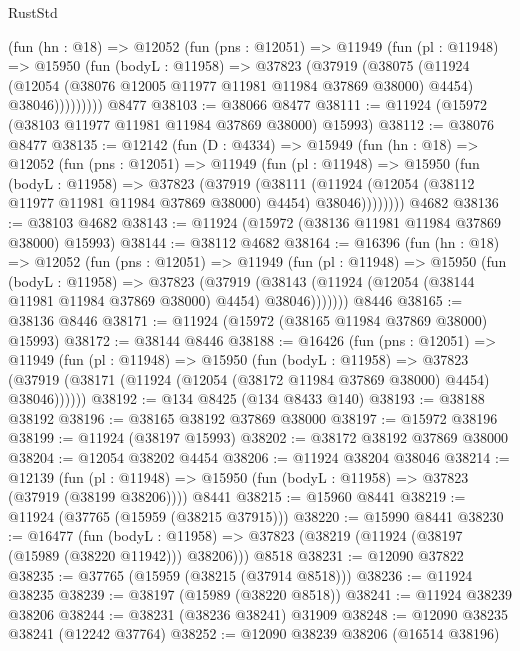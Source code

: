 \begin{lexlean}{RustStd}
\begin{coremodule}
        (fun (hn : @18) =>
        @12052
          (fun (pns : @12051) =>
          @11949
            (fun (pl : @11948) =>
            @15950
              (fun (bodyL : @11958) =>
              @37823
                (@37919
                  (@38075
                    (@11924
                      (@12054 (@38076 @12005 @11977 @11981 @11984 @37869 @38000) @4454)
                      @38046)))))))))
    @8477
@38103 := @38066 @8477
@38111 := @11924 (@15972 (@38103 @11977 @11981 @11984 @37869 @38000) @15993)
@38112 := @38076 @8477
@38135 := @12142
    (fun (D : @4334) =>
    @15949
      (fun (hn : @18) =>
      @12052
        (fun (pns : @12051) =>
        @11949
          (fun (pl : @11948) =>
          @15950
            (fun (bodyL : @11958) =>
            @37823
              (@37919
                (@38111
                  (@11924 (@12054 (@38112 @11977 @11981 @11984 @37869 @38000) @4454) @38046))))))))
    @4682
@38136 := @38103 @4682
@38143 := @11924 (@15972 (@38136 @11981 @11984 @37869 @38000) @15993)
@38144 := @38112 @4682
@38164 := @16396
    (fun (hn : @18) =>
    @12052
      (fun (pns : @12051) =>
      @11949
        (fun (pl : @11948) =>
        @15950
          (fun (bodyL : @11958) =>
          @37823
            (@37919
              (@38143 (@11924 (@12054 (@38144 @11981 @11984 @37869 @38000) @4454) @38046)))))))
    @8446
@38165 := @38136 @8446
@38171 := @11924 (@15972 (@38165 @11984 @37869 @38000) @15993)
@38172 := @38144 @8446
@38188 := @16426
    (fun (pns : @12051) =>
    @11949
      (fun (pl : @11948) =>
      @15950
        (fun (bodyL : @11958) =>
        @37823 (@37919 (@38171 (@11924 (@12054 (@38172 @11984 @37869 @38000) @4454) @38046))))))
@38192 := @134 @8425 (@134 @8433 @140)
@38193 := @38188 @38192
@38196 := @38165 @38192 @37869 @38000
@38197 := @15972 @38196
@38199 := @11924 (@38197 @15993)
@38202 := @38172 @38192 @37869 @38000
@38204 := @12054 @38202 @4454
@38206 := @11924 @38204 @38046
@38214 := @12139
    (fun (pl : @11948) => @15950 (fun (bodyL : @11958) => @37823 (@37919 (@38199 @38206))))
    @8441
@38215 := @15960 @8441
@38219 := @11924 (@37765 (@15959 (@38215 @37915)))
@38220 := @15990 @8441
@38230 := @16477
    (fun (bodyL : @11958) => @37823 (@38219 (@11924 (@38197 (@15989 (@38220 @11942))) @38206)))
    @8518
@38231 := @12090 @37822
@38235 := @37765 (@15959 (@38215 (@37914 @8518)))
@38236 := @11924 @38235
@38239 := @38197 (@15989 (@38220 @8518))
@38241 := @11924 @38239 @38206
@38244 := @38231 (@38236 @38241) @31909
@38248 := @12090 @38235 @38241 (@12242 @37764)
@38252 := @12090 @38239 @38206 (@16514 @38196)

\end{coremodule}
\end{lexlean}
